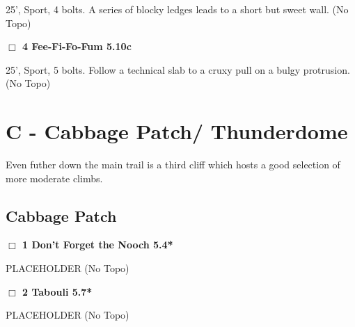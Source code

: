 \begin{multicols}{2}
\begin{adjustwidth}{1.3em}{}
25', Sport, 4 bolts. A series of blocky ledges leads to a short but sweet wall.
  (No Topo)
\end{adjustwidth}




\needspace{2em}
\label{rt:Fee-Fi-Fo-Fum}
\colorbox{RoyalBlue!20}{
\parbox{0.95\linewidth}{
\hspace{-1ex}\textbf{$\Box$
4 Fee-Fi-Fo-Fum 5.10c  
}}}
\begin{adjustwidth}{1.3em}{}			

25', Sport, 5 bolts. Follow a technical slab to a cruxy pull on a bulgy protrusion.
  (No Topo)
\end{adjustwidth}





\newpage

\section{C - Cabbage Patch/ Thunderdome}\label{sa:Cabbage Patch/ Thunderdome}

Even futher down the main trail is a third cliff which hosts a good selection of more moderate climbs.\\




\needspace{10em}
\subsection*{Cabbage Patch}\label{bf:Cabbage Patch}




\needspace{2em}
\label{rt:Don't Forget the Nooch}
\colorbox{green!20}{
\parbox{0.95\linewidth}{
\hspace{-1ex}\textbf{$\Box$
1 Don't Forget the Nooch 5.4*  
}}}
\begin{adjustwidth}{1.3em}{}			

PLACEHOLDER
  (No Topo)
\end{adjustwidth}




\needspace{2em}
\label{rt:Tabouli}
\colorbox{green!20}{
\parbox{0.95\linewidth}{
\hspace{-1ex}\textbf{$\Box$
2 Tabouli 5.7*  
}}}
\begin{adjustwidth}{1.3em}{}			

PLACEHOLDER
  (No Topo)
\end{adjustwidth}





\end{multicols}
